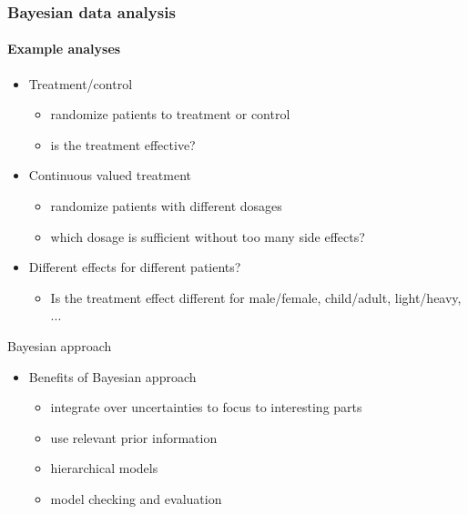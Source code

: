 \documentclass[10pt,handout]{beamer}
\begin{document}
\begin{frame}
  \frametitle{Bayesian data analysis}  %
  \framesubtitle{Example analyses}
  \begin{itemize}
  \item Treatment/control
    \begin{itemize}
    \item randomize patients to treatment or control
    \item is the treatment effective?
    \end{itemize}
    \pause
  \item Continuous valued treatment
    \begin{itemize}
    \item randomize patients with different dosages
    \item which dosage is sufficient without too many side effects?
    \end{itemize}
    \pause
  \item Different effects for different patients?
    \begin{itemize}
    \item Is the treatment effect different for male/female, child/adult, light/heavy, ...
    \end{itemize}
  \end{itemize}

\end{frame}

\begin{frame}{Bayesian approach}

  \begin{itemize}
  \item Benefits of Bayesian approach
    \begin{itemize}
    \item integrate over uncertainties to focus to interesting parts
    \item use relevant prior information
    \item hierarchical models
    \item model checking and evaluation
    \end{itemize}
  \end{itemize}
\end{frame}
\end{document}
